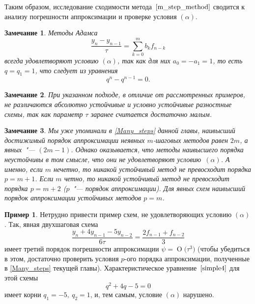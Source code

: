 \documentclass[11pt,a4paper,twoside]{report}
\numberwithin{equation}{section}
\theoremstyle{definition}
\newtheorem*{example*}{Пример}
\theoremstyle{plain}
\newtheorem{note}{Замечание}[section]
\newcommand{\bigO}[1]{\ensuremath{\operatorname{O}\bigl(#1\bigr)}}
\begin{document}
Таким образом, исследование сходимости метода~$\eqref{m_step_method}$ сводится к
анализу погрешности аппроксимации и проверке условия $(\alpha)$.
%
\begin{note}
%
    Методы Адамса
    $$
        \dfrac{y_n-y_{n-1}}{\tau}=\sum\limits_{k=0}^mb_kf_{n-k}
    $$
    всегда удовлетворяют условию $(\alpha)$, так как для них
    $a_0=-a_1=1$, то есть $q=q_1=1$, что следует из уравнения
    $$
        q^n-q^{n-1}=0.
    $$
%
\end{note}
%
%
\begin{note}
%
    При указанном подходе, в отличие от рассмотренных примеров, не различаются
    абсолютно устойчивые и условно устойчивые разностные схемы, так как параметр $\tau$
    заранее считается достаточно малым.
%
\end{note}
%
%
\begin{note}
%
    Мы уже упоминали в \ref{Many_steps} данной главы, наивысший достижимый порядок аппроксимации неявных
    $m$-шаговых методов равен $2m$, а явных~"--- $(2m-1)$. Однако оказывается,
    что методы наивысшего порядка неустойчивы в том смысле, что они не
    удовлетворяют условию~$(\alpha)$. А именно, если $m$ нечетно, то никакой
    устойчивый метод не превосходит порядка $p=m+1$. Если $m$ четно, то никакой
    устойчивый метод не превосходит порядка $p=m+2$ ($p$~"--- порядок аппроксимации).
    Для явных схем наивысший порядок аппроксимации устойчивых методов $p=m$.
%
\end{note}
%
\begin{example*}
%
Нетрудно привести пример схем, не удовлетворяющих условию $(\alpha)$. Так, явная
двухшаговая схема
%
$$
    \dfrac{y_n+4y_{n-1}-5y_{n-2}}{6\tau} = \dfrac{2f_{n-1} + f_{n-2}}{3}
$$
%
имеет третий порядок погрешности аппроксимации $\psi = \bigO{\tau^3}$
(чтобы убедиться в этом, достаточно проверить условия $p$-ого порядка
аппроксимации, полученные в \ref{Many_steps} текущей главы).
Характеристическое уравнение~$\eqref{simple4}$ для этой схемы
%
$$
    q^2+4q-5=0
$$
%
имеет корни $q_1=-5,~q_2=1$, и, тем самым, условие $(\alpha)$ нарушено.
%
\end{example*}
%
%
\end{document}
